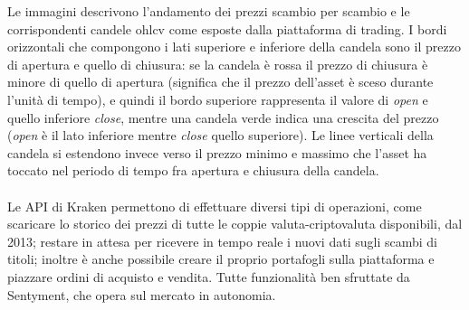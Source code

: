 \documentclass[a4paper,12pt]{report}
\begin{document}
Le immagini descrivono l'andamento dei prezzi scambio per scambio e le corrispondenti candele ohlcv come esposte dalla piattaforma di trading. I bordi orizzontali che compongono i lati superiore e inferiore della candela sono il prezzo di apertura e quello di chiusura: se la candela è rossa il prezzo di chiusura è minore di quello di apertura (significa che il prezzo dell'asset è sceso durante l'unità di tempo), e quindi il bordo superiore rappresenta il valore di \textit{open} e quello inferiore \textit{close}, mentre una candela verde indica una crescita del prezzo (\textit{open} è il lato inferiore mentre \textit{close} quello superiore). Le linee verticali della candela si estendono invece verso il prezzo minimo e massimo che l'asset ha toccato nel periodo di tempo fra apertura e chiusura della candela.
\\~\\
Le API di Kraken permettono di effettuare diversi tipi di operazioni, come scaricare lo storico dei prezzi di tutte le coppie valuta-criptovaluta disponibili, dal 2013; restare in attesa per ricevere in tempo reale i nuovi dati sugli scambi di titoli; inoltre è anche possibile creare il proprio portafogli sulla piattaforma e piazzare ordini di acquisto e vendita. Tutte funzionalità ben sfruttate da Sentyment, che opera sul mercato in autonomia.
\end{document}
